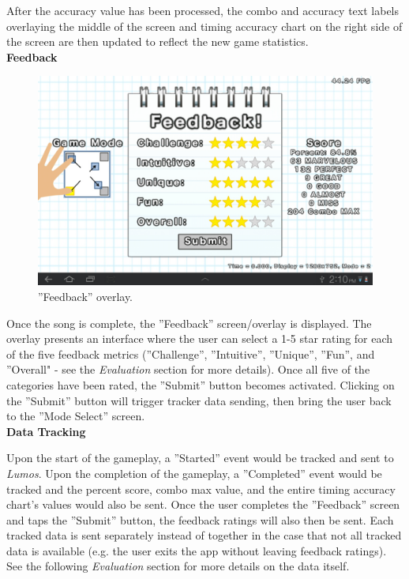 \documentclass{sig-alternate}
\begin{document}
After the accuracy value has been processed, the combo and accuracy text labels overlaying the middle of the screen and timing accuracy chart on the right side of the screen are then updated to reflect the new game statistics. \\

\newpage
\noindent \textbf{Feedback}

\begin{figure}[htb!]
	\begin{center}
		\includegraphics[width=1\linewidth]{figure_screenshot_feedback}
	\end{center}
	\vspace{-12pt}
	\caption{''Feedback'' overlay.}
	\label{fig:screenshot_feedback}
\end{figure}

Once the song is complete, the ''Feedback'' screen/overlay is displayed. The overlay presents an interface where the user can select a 1-5 star rating for each of the five feedback metrics (''Challenge'', ''Intuitive'', ''Unique'', ''Fun'', and ''Overall" - see the \textit{Evaluation} section for more details). Once all five of the categories have been rated, the ''Submit'' button becomes activated. Clicking on the ''Submit'' button will trigger tracker data sending, then bring the user back to the ''Mode Select'' screen.\\

\noindent \textbf{Data Tracking}

Upon the start of the gameplay, a ''Started'' event would be tracked and sent to \textit{Lumos}. Upon the completion of the gameplay, a ''Completed'' event would be tracked and the percent score, combo max value, and the entire timing accuracy chart's values would also be sent. Once the user completes the ''Feedback'' screen and taps the ''Submit'' button, the feedback ratings will also then be sent. Each tracked data is sent separately instead of together in the case that not all tracked data is available (e.g. the user exits the app without leaving feedback ratings). See the following \textit{Evaluation} section for more details on the data itself.
\end{document}
